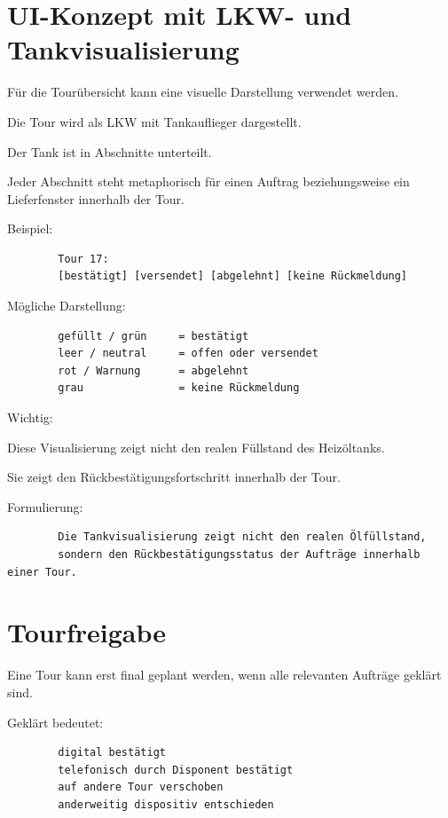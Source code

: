 \documentclass[12pt,a4paper]{article}
\begin{document}
	\section{UI-Konzept mit LKW- und Tankvisualisierung}
	
	Für die Tourübersicht kann eine visuelle Darstellung verwendet werden.
	
	Die Tour wird als LKW mit Tankauflieger dargestellt.
	
	Der Tank ist in Abschnitte unterteilt.
	
	Jeder Abschnitt steht metaphorisch für einen Auftrag beziehungsweise ein Lieferfenster innerhalb der Tour.
	
	Beispiel:
	
	\begin{lstlisting}
		Tour 17:
		[bestätigt] [versendet] [abgelehnt] [keine Rückmeldung]
	\end{lstlisting}
	
	Mögliche Darstellung:
	
	\begin{lstlisting}
		gefüllt / grün     = bestätigt
		leer / neutral     = offen oder versendet
		rot / Warnung      = abgelehnt
		grau               = keine Rückmeldung
	\end{lstlisting}
	
	Wichtig:
	
	Diese Visualisierung zeigt nicht den realen Füllstand des Heizöltanks.
	
	Sie zeigt den Rückbestätigungsfortschritt innerhalb der Tour.
	
	Formulierung:
	
	\begin{lstlisting}
		Die Tankvisualisierung zeigt nicht den realen Ölfüllstand,
		sondern den Rückbestätigungsstatus der Aufträge innerhalb einer Tour.
	\end{lstlisting}
	
	\section{Tourfreigabe}
	
	Eine Tour kann erst final geplant werden, wenn alle relevanten Aufträge geklärt sind.
	
	Geklärt bedeutet:
	
	\begin{lstlisting}
		digital bestätigt
		telefonisch durch Disponent bestätigt
		auf andere Tour verschoben
		anderweitig dispositiv entschieden
	\end{lstlisting}
	
\end{document}
